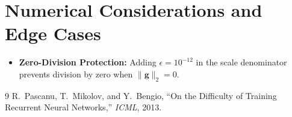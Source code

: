 \documentclass[11pt]{article}
\begin{document}
\section{Numerical Considerations and Edge Cases}
\label{sec:numerical}

\begin{itemize}
    \item \textbf{Zero-Division Protection:} Adding $\epsilon = 10^{-12}$ in the scale denominator prevents division by zero when $\|\mathbf{g}\|_2 = 0$.
\end{itemize}

\begin{thebibliography}{9}
 R.~Pascanu, T.~Mikolov, and Y.~Bengio, ``On the Difficulty of Training Recurrent Neural Networks,'' \emph{ICML}, 2013.
\end{thebibliography}
\end{document}
